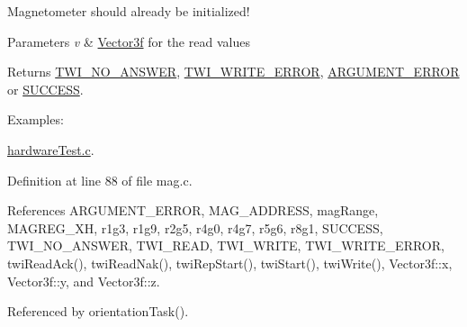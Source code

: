 Magnetometer should already be initialized! 
\begin{DoxyParams}{Parameters}
{\em v} & \hyperlink{struct_vector3f}{Vector3f} for the read values \\
\hline
\end{DoxyParams}
\begin{DoxyReturn}{Returns}
\hyperlink{group__error_gga2c3e4bb40f36b262a5214e2da2bca9c5a04d5943ba652af2205c88b247e0c659c}{T\-W\-I\-\_\-\-N\-O\-\_\-\-A\-N\-S\-W\-E\-R}, \hyperlink{group__error_gga2c3e4bb40f36b262a5214e2da2bca9c5ac0e3b3463dcaf220e54794b4711708c9}{T\-W\-I\-\_\-\-W\-R\-I\-T\-E\-\_\-\-E\-R\-R\-O\-R}, \hyperlink{group__error_gga2c3e4bb40f36b262a5214e2da2bca9c5a49ccf277a69dd938c591928aa27c66cc}{A\-R\-G\-U\-M\-E\-N\-T\-\_\-\-E\-R\-R\-O\-R} or \hyperlink{group__error_gga2c3e4bb40f36b262a5214e2da2bca9c5ac7f69f7c9e5aea9b8f54cf02870e2bf8}{S\-U\-C\-C\-E\-S\-S}. 
\end{DoxyReturn}
\begin{Desc}
\item[Examples\-: ]\par
\hyperlink{hardware_test_8c-example}{hardware\-Test.\-c}.\end{Desc}


Definition at line 88 of file mag.\-c.



References A\-R\-G\-U\-M\-E\-N\-T\-\_\-\-E\-R\-R\-O\-R, M\-A\-G\-\_\-\-A\-D\-D\-R\-E\-S\-S, mag\-Range, M\-A\-G\-R\-E\-G\-\_\-\-X\-H, r1g3, r1g9, r2g5, r4g0, r4g7, r5g6, r8g1, S\-U\-C\-C\-E\-S\-S, T\-W\-I\-\_\-\-N\-O\-\_\-\-A\-N\-S\-W\-E\-R, T\-W\-I\-\_\-\-R\-E\-A\-D, T\-W\-I\-\_\-\-W\-R\-I\-T\-E, T\-W\-I\-\_\-\-W\-R\-I\-T\-E\-\_\-\-E\-R\-R\-O\-R, twi\-Read\-Ack(), twi\-Read\-Nak(), twi\-Rep\-Start(), twi\-Start(), twi\-Write(), Vector3f\-::x, Vector3f\-::y, and Vector3f\-::z.



Referenced by orientation\-Task().


